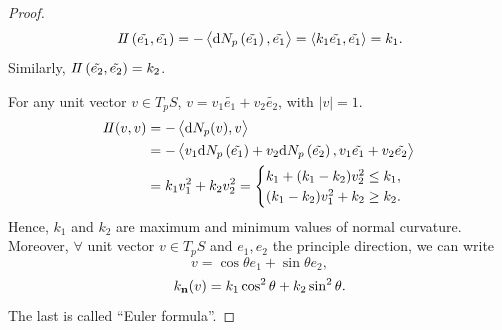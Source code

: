 \begin{proof}
    \[
    I\!I\left(\tilde{e_1},\tilde{e_1}\right)=-\left\langle
        \dd N_p\left(\tilde{e_1}\right),\tilde{e_1}\right\rangle
        =\left\langle k_1 \tilde{e_1},\tilde{e_1}\right\rangle
        =k_1.
    \]
    Similarly, \(I\!I\left(\tilde{e_2},\tilde{e_2}\right)=k_2\).

    For any unit vector \(v\in T_p S\), \(v=
    v_1\tilde{e_1}+v_2\tilde{e_2}\), with \(|v|=1\).
    \begin{align*}
        I\!I(v,v)&=-\left\langle \dd N_p(v),v\right\rangle\\
        &=-\left\langle v_1 \dd N_p\left(\tilde{e_1}\right)
        +v_2\dd N_p\left(\tilde{e_2}\right),v_1\tilde{e_1}+v_2
        \tilde{e_2}\right\rangle\\
        &=k_1 v_1^2 +k_2 v_2^2=
        \begin{cases}
            k_1+(k_1-k_2)v_2^2\le k_1,\\
            (k_1-k_2)v_1^2+k_2\ge k_2.
        \end{cases}
    \end{align*}
    Hence, \(k_1\) and \(k_2\) are maximum and minimum values of normal
    curvature. Moreover, \(\forall\) unit vector \(v\in T_p S\) and 
    {\(e_1,e_2\)} the principle direction, we can write
    \[
        v=\cos \theta e_1+\sin\theta e_2,
    \]
    \[
        k_{\vb{n}}(v)=k_1 \cos^2\theta +k_2 \sin^2\theta.    
    \]
    The last is called ``Euler formula''.
\end{proof}
